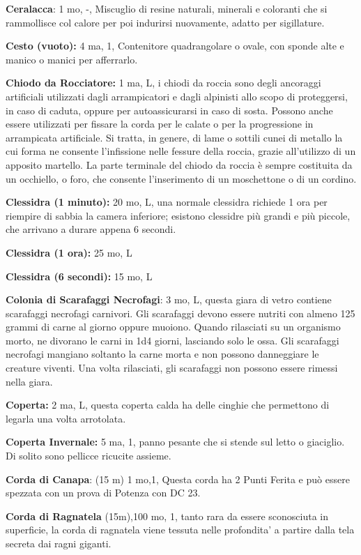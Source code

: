 \documentclass[a4paper,11pt,twoside,openany]{book}
\begin{document}
\textbf{Ceralacca}: 1 mo, -, Miscuglio di resine naturali, minerali e coloranti che si rammollisce col calore per poi indurirsi nuovamente, adatto per sigillature.

\textbf{Cesto (vuoto):} 4 ma, 1, Contenitore quadrangolare o ovale, con sponde alte e manico o manici per afferrarlo.

\textbf{Chiodo da Rocciatore:} 1 ma, L, i chiodi da roccia sono degli ancoraggi artificiali utilizzati dagli arrampicatori e dagli alpinisti allo scopo di proteggersi, in caso di caduta, oppure per autoassicurarsi in caso di sosta. Possono anche essere utilizzati per fissare la corda per le calate o per la progressione in arrampicata artificiale. Si tratta, in genere, di lame o sottili cunei di metallo la cui forma ne consente l'infissione nelle fessure della roccia, grazie all'utilizzo di un apposito martello. La parte terminale del chiodo da roccia è sempre costituita da un occhiello, o foro, che consente l'inserimento di un moschettone o di un cordino.

\textbf{Clessidra (1 minuto):} 20 mo, L, una normale clessidra richiede 1 ora per riempire di sabbia la camera inferiore; esistono clessidre più grandi e più piccole, che arrivano a durare appena 6
secondi.

\textbf{Clessidra (1 ora):} 25 mo, L

\textbf{Clessidra (6 secondi):} 15 mo, L

\textbf{Colonia di Scarafaggi Necrofagi}: 3 mo, L, questa giara di vetro contiene scarafaggi necrofagi carnivori. Gli scarafaggi devono essere nutriti con almeno 125 grammi di carne al giorno oppure muoiono. Quando rilasciati su un organismo morto, ne divorano le carni in 1d4 giorni, lasciando solo le ossa. Gli scarafaggi necrofagi mangiano soltanto la carne morta e non possono danneggiare le creature viventi. Una volta rilasciati, gli scarafaggi non possono essere rimessi nella giara.

\textbf{Coperta:} 2 ma, L, questa coperta calda ha delle cinghie che permettono di legarla una volta arrotolata.

\textbf{Coperta Invernale:} 5 ma, 1, panno pesante che si stende sul letto o giaciglio. Di solito sono pellicce ricucite assieme.

\textbf{Corda di Canapa}: (15 m) 1 mo,1, Questa corda ha 2 Punti Ferita e può essere spezzata con un prova di Potenza con DC 23.

\textbf{Corda di Ragnatela} (15m),100 mo, 1, tanto rara da essere sconosciuta in superficie, la corda di ragnatela viene tessuta nelle profondita’ a partire dalla tela secreta dai ragni giganti.
\end{document}
